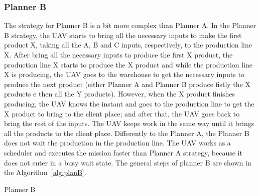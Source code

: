 \documentclass[conference,harvard,brazil,english]{sbatex}
\begin{document}
\subsubsection{Planner B}

The strategy for Planner B is a bit more complex than Planner A. In the Planner B strategy, the UAV starts to bring all the necessary inputs to make the first product X, taking all the A, B and C inputs, respectively, to the production line X. After bring all the necessary inputs to produce the first X product, the production line X starts to produce the X product and while the production line X is producing, the UAV goes to the warehouse to get the necessary inputs to produce the next product (either Planner A and Planner B produce fistly the X products e then all the Y products). However, when the X product finishes producing, the UAV knows the instant and goes to the production line to get the X product to bring to the client place; and after that, the UAV goes back to bring the rest of the inputs. The UAV keeps work in the same way until it brings all the products to the client place. Differently to the Planner A, the Planner B does not wait the production in the production line. The UAV works as a scheduler and executes the mission faster than Planner A strategy, because it does not enter in a busy wait state. The general steps of planner B are shown in the Algorithm~\ref{alg:planB}.
%
\begin{algorithm}[ht]
\scriptsize
{}
\captionsetup{list=no}
\caption{Planner B}\label{alg:planB}
\end{algorithm}
\end{document}
